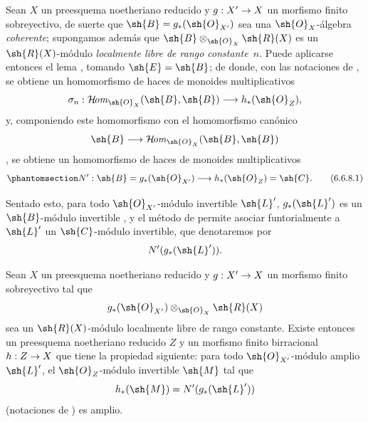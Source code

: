 \documentclass[oneside,10pt]{amsart}
\makeatletter
\newcommand{\ega@arrow}[2]{\mathchoice{#1}{#2}{#2}{#2}}
\renewcommand{\to}{\ega@arrow{\longrightarrow}{\rightarrow}}
\def\shHom{\mathcal{H}\!\mathit{om}}
\let\EGAOriginalLabel\label
\renewcommand{\label}[1]{\phantomsection\EGAOriginalLabel{#1}}
\makeatother
\begin{document}
\begin{env}[6.6.8]
\label{II.6.6.8}
Sean $X$ un preesquema noetheriano reducido y $g:X'\to X$ un morfismo finito sobreyectivo, de suerte que $\sh{B}=g_*(\sh{O}_{X'})$ sea una $\sh{O}_X$-álgebra \emph{coherente};
supongamos además que $\sh{B}\otimes_{\sh{O}_X}\sh{R}(X)$ es un $\sh{R}(X)$-módulo \emph{localmente libre de rango constante~$n$}.
Puede aplicarse entonces el lema , tomando $\sh{E}=\sh{B}$;
de donde, con las notaciones de , se obtiene un homomorfismo de haces de monoides multiplicativos
\[
  \sigma_n:\shHom_{\sh{O}_X}(\sh{B},\sh{B})\to h_*(\sh{O}_Z),
\]
y, componiendo este homomorfismo con el homomorfismo canónico
\[
  \sh{B}\to\shHom_{\sh{O}_X}(\sh{B},\sh{B})
\]
, se obtiene un homomorfismo de haces de monoides multiplicativos
\[
\label{II.6.6.8.1}
  N':\sh{B}=g_*(\sh{O}_{X'})\to h_*(\sh{O}_Z)=\sh{C}.
\tag{6.6.8.1}
\]

Sentado esto, para todo $\sh{O}_{X'}$-módulo invertible $\sh{L}'$, $g_*(\sh{L}')$ es un $\sh{B}$-módulo invertible , y el método de  permite asociar funtorialmente a $\sh{L}'$ un $\sh{C}$-módulo invertible, que denotaremos por
\[
  N'(g_*(\sh{L}')).
\]
\end{env}

\begin{lemma}[6.6.9]
\label{II.6.6.9}
Sean $X$ un preesquema noetheriano reducido y $g:X'\to X$ un morfismo finito sobreyectivo tal que
\[
  g_*(\sh{O}_{X'})\otimes_{\sh{O}_X}\sh{R}(X)
\]
sea un $\sh{R}(X)$-módulo localmente libre de rango constante.
Existe entonces un preesquema noetheriano reducido $Z$ y un morfismo finito birracional $h:Z\to X$ que tiene la propiedad siguiente: para todo $\sh{O}_{X'}$-módulo amplio $\sh{L}'$, el $\sh{O}_Z$-módulo invertible $\sh{M}$ tal que
\[
  h_*(\sh{M})=N'(g_*(\sh{L}'))
\]
\textup{(notaciones de )} es amplio.
\end{lemma}
\end{document}
